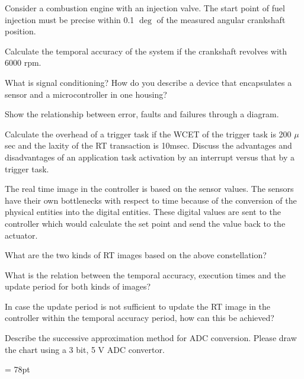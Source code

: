 
Consider a combustion engine with an injection valve. The start point of fuel injection must be precise within 0.1 $\deg$ of the measured angular crankshaft position.
\begin{unteraufgaben}
\item Calculate the temporal accuracy of the system if the crankshaft revolves with 6000 rpm.
\end{unteraufgaben}


What is signal conditioning? How do you describe a device that encapsulates a sensor and a microcontroller in one housing? 


Show the relationship between error, faults and failures through a diagram.




Calculate the overhead of a trigger task if the WCET of the trigger task is 200 $\mu$sec and the laxity of the RT transaction is 10msec. Discuss the advantages and disadvantages of an application task activation by an interrupt versus that by a trigger task.


The real time image in the controller is based on the sensor values. The sensors have their own bottlenecks with respect to time because of the conversion of the physical entities into the digital entities. These digital values are sent to the controller which would calculate the set point and send the value back to the actuator.
\begin{unteraufgaben}

\item What are the two kinds of RT images based on the above constellation?
\item What is the relation between the temporal accuracy, execution times and the update period for both kinds of images?
\item In case the update period is not sufficient to update the RT image in the controller within the temporal accuracy period, how can this be achieved?
\end{unteraufgaben}



Describe the successive approximation method for ADC conversion. Please draw the chart using a 3 bit, 5 V  ADC convertor. 

\pagebreak
\headheight = 78pt

